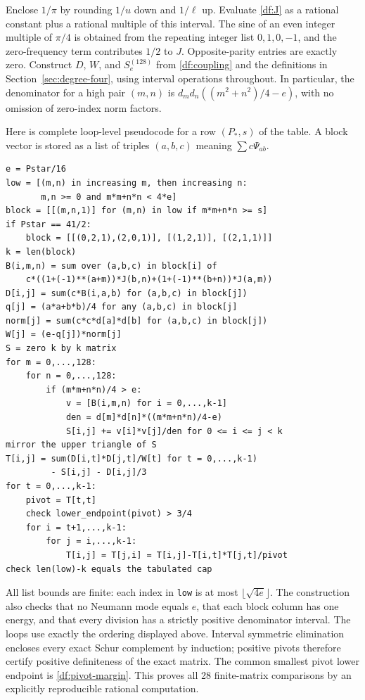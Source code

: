 \documentclass[11pt,reqno]{amsart}
\numberwithin{equation}{section}
\begin{document}
Enclose $1/\pi$ by rounding $1/u$ down and $1/\ell$ up. Evaluate
\eqref{df:J} as a rational constant plus a rational multiple of this
interval. The sine of an even integer multiple of $\pi/4$ is obtained
from the repeating integer list $0,1,0,-1$, and the zero-frequency
term contributes $1/2$ to $J$. Opposite-parity entries are exactly
zero. Construct $D$, $W$, and $S_e^{(128)}$ from
\eqref{df:coupling} and the definitions in
Section~\ref{sec:degree-four}, using interval operations throughout.
In particular, the denominator for a high pair $(m,n)$ is
$d_md_n((m^2+n^2)/4-e)$, with no omission of zero-index norm factors.

Here is complete loop-level pseudocode for a row $(P_*,s)$ of the
table. A block vector is stored as a list of triples $(a,b,c)$
meaning $\sum c\Psi_{ab}$.
\begin{verbatim}
e = Pstar/16
low = [(m,n) in increasing m, then increasing n:
       m,n >= 0 and m*m+n*n < 4*e]
block = [[(m,n,1)] for (m,n) in low if m*m+n*n >= s]
if Pstar == 41/2:
    block = [[(0,2,1),(2,0,1)], [(1,2,1)], [(2,1,1)]]
k = len(block)
B(i,m,n) = sum over (a,b,c) in block[i] of
    c*((1+(-1)**(a+m))*J(b,n)+(1+(-1)**(b+n))*J(a,m))
D[i,j] = sum(c*B(i,a,b) for (a,b,c) in block[j])
q[j] = (a*a+b*b)/4 for any (a,b,c) in block[j]
norm[j] = sum(c*c*d[a]*d[b] for (a,b,c) in block[j])
W[j] = (e-q[j])*norm[j]
S = zero k by k matrix
for m = 0,...,128:
    for n = 0,...,128:
        if (m*m+n*n)/4 > e:
            v = [B(i,m,n) for i = 0,...,k-1]
            den = d[m]*d[n]*((m*m+n*n)/4-e)
            S[i,j] += v[i]*v[j]/den for 0 <= i <= j < k
mirror the upper triangle of S
T[i,j] = sum(D[i,t]*D[j,t]/W[t] for t = 0,...,k-1)
         - S[i,j] - D[i,j]/3
for t = 0,...,k-1:
    pivot = T[t,t]
    check lower_endpoint(pivot) > 3/4
    for i = t+1,...,k-1:
        for j = i,...,k-1:
            T[i,j] = T[j,i] = T[i,j]-T[i,t]*T[j,t]/pivot
check len(low)-k equals the tabulated cap
\end{verbatim}
All list bounds are finite: each index in \texttt{low} is at most
$\lfloor\sqrt{4e}\rfloor$. The construction also checks that no
Neumann mode equals $e$, that each block column has one energy,
and that every division has a strictly positive denominator interval.
The loops use exactly the ordering displayed above. Interval
symmetric elimination encloses every exact Schur complement by
induction; positive pivots therefore certify positive definiteness
of the exact matrix. The common smallest pivot lower endpoint is
\eqref{df:pivot-margin}. This proves all 28 finite-matrix comparisons
by an explicitly reproducible rational computation.
\end{document}
